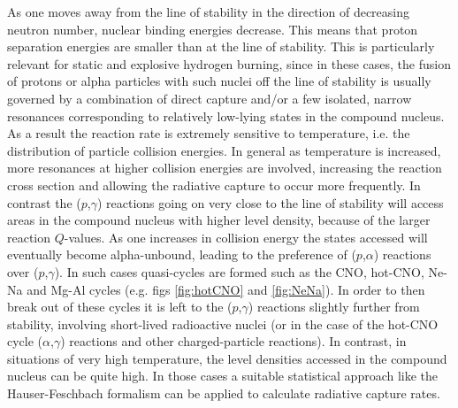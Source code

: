 As one moves away from the line of stability in the direction of decreasing neutron number, nuclear binding energies decrease. This means that proton separation energies are smaller than at the line of stability. This is particularly relevant for static and explosive hydrogen burning, since in these cases, the fusion of protons or alpha particles with such nuclei off the line of stability is usually governed by a combination of direct capture and/or a few isolated, narrow resonances corresponding to relatively low-lying states in the compound nucleus. As a result the reaction rate is extremely sensitive to temperature, i.e. the distribution of particle collision energies. In general as temperature is increased, more resonances at higher collision energies are involved, increasing the reaction cross section and allowing the radiative capture to occur more frequently. In contrast the ($p$,$\gamma$) reactions going on very close to the line of stability will access areas in the compound nucleus with higher level density, because of the larger reaction $Q$-values. As one increases in collision energy the states accessed will eventually become alpha-unbound, leading to the preference of ($p$,$\alpha$) reactions over ($p$,$\gamma$). In such cases quasi-cycles are formed such as the CNO, hot-CNO, Ne-Na and Mg-Al cycles (e.g. figs \ref{fig:hotCNO} and \ref{fig:NeNa}). In order to then break out of these cycles it is left to the ($p$,$\gamma$) reactions slightly further from stability, involving short-lived radioactive nuclei (or in the case of the hot-CNO cycle ($\alpha$,$\gamma$) reactions and other charged-particle reactions). In contrast, in situations of very high temperature, the level densities accessed in the compound nucleus can be quite high. In those cases a suitable statistical approach like the Hauser-Feschbach \cite{Hau52} formalism can be applied to calculate radiative capture rates.  

